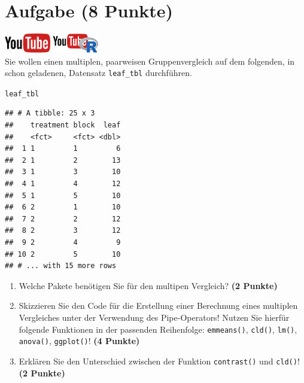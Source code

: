 \documentclass[a4paper, 10pt]{scrartcl}\usepackage[]{graphicx}\usepackage[]{xcolor}
\makeatletter
\newcommand{\hlstd}[1]{\textcolor[rgb]{0.345,0.345,0.345}{#1}}%
\newenvironment{kframe}{%
 \def\at@end@of@kframe{}%
 \ifinner\ifhmode%
  \def\at@end@of@kframe{\end{minipage}}%
  \begin{minipage}{\columnwidth}%
 \fi\fi%
 \def\FrameCommand##1{\hskip\@totalleftmargin \hskip-\fboxsep
 \colorbox{shadecolor}{##1}\hskip-\fboxsep
     \hskip-\linewidth \hskip-\@totalleftmargin \hskip\columnwidth}%
 \MakeFramed {\advance\hsize-\width
   \@totalleftmargin\z@ \linewidth\hsize
   \@setminipage}}%
 {\par\unskip\endMakeFramed%
 \at@end@of@kframe}
\newenvironment{knitrout}{}{} %
\makeatother
\begin{document}
 
\clearpage

\section{Aufgabe \hfill (8 Punkte)}

\hfill\href{https://youtu.be/f5fHm_jCHe4}{\includegraphics[width =
  2cm]{img/youtube}}
\hspace{2Ex}
\href{https://youtu.be/_EGebjrOCUQ}{\includegraphics[width =
  2cm]{img/youtube_R}}\\[1Ex]


Sie wollen einen multiplen, paarweisen Gruppenvergleich auf dem folgenden, in \Rlogo schon geladenen, Datensatz \texttt{leaf\_tbl} durchf{\"u}hren.



\begin{knitrout}
\color{fgcolor}\begin{kframe}
\begin{alltt}
\hlstd{leaf_tbl}
\end{alltt}
\begin{verbatim}
## # A tibble: 25 x 3
##    treatment block  leaf
##    <fct>     <fct> <dbl>
##  1 1         1         6
##  2 1         2        13
##  3 1         3        10
##  4 1         4        12
##  5 1         5        10
##  6 2         1        10
##  7 2         2        12
##  8 2         3        12
##  9 2         4         9
## 10 2         5        10
## # ... with 15 more rows
\end{verbatim}
\end{kframe}
\end{knitrout}

\begin{enumerate}
\item Welche \Rlogo Pakete ben{\"o}tigen Sie f{\"u}r den multipen Vergleich?
  \textbf{(2 Punkte)} 
\item Skizzieren Sie den \Rlogo Code f{\"u}r die Erstellung einer
  Berechnung eines multiplen Vergleiches unter der Verwendung des
  Pipe-Operators! Nutzen Sie hierf{\"u}r folgende Funktionen in der passenden
  Reihenfolge: \texttt{emmeans()},  \texttt{cld()},
  \texttt{lm()},  \texttt{anova()},  \texttt{ggplot()}!  \textbf{(4 Punkte)}
\item Erkl{\"a}ren Sie den Unterschied zwischen der Funktion
  \texttt{contrast()} und \texttt{cld()}!
  \textbf{(2 Punkte)}
\end{enumerate}
\end{document}
